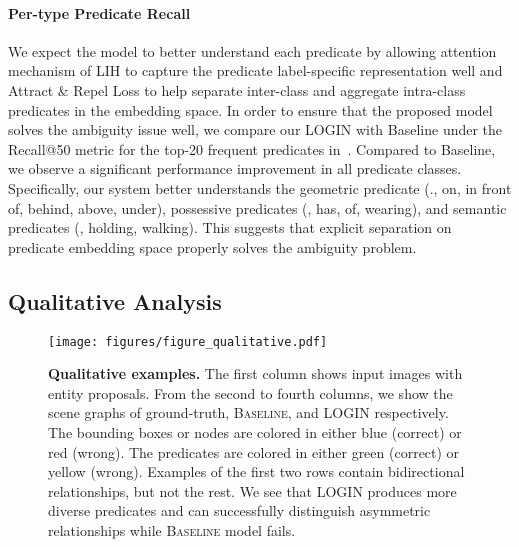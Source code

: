         \paragraph{Per-type Predicate Recall}
            We expect the model to better understand each predicate by allowing attention mechanism of LIH to capture the predicate label-specific representation well and Attract \& Repel Loss to help separate inter-class and aggregate intra-class predicates in the embedding space. In order to ensure that the proposed model solves the ambiguity issue well, we compare our LOGIN with Baseline under the Recall@50 metric for the top-20 frequent predicates in~.
            Compared to Baseline, we observe a significant performance improvement in all predicate classes.
            Specifically, our system better understands the geometric predicate (\eg., on, in front of, behind, above, under), possessive predicates (\eg, has, of, wearing), and semantic predicates (\eg, holding, walking).
            This suggests that explicit separation on predicate embedding space properly solves the ambiguity problem.
            
    \subsection{Qualitative Analysis}
    \label{section:qualitative}
        \begin{figure*}[p!]
            \texttt{[image: figures/figure\_qualitative.pdf]}
            \captionsetup{font=footnotesize}
            \caption{
                \textbf{Qualitative examples.} The first column shows input images with entity proposals. From the second to fourth columns, we show the scene graphs of ground-truth, \textsc{Baseline}, and \textsc{LOGIN} respectively. The bounding boxes or nodes are colored in either blue (correct) or red (wrong). The predicates are colored in either green (correct) or yellow (wrong). Examples of the first two rows contain bidirectional relationships, but not the rest. We see that LOGIN produces more diverse predicates and can successfully distinguish asymmetric relationships while \textsc{Baseline} model fails.
            }
            \label{fig:QualitativeResults}
        \end{figure*}
        
